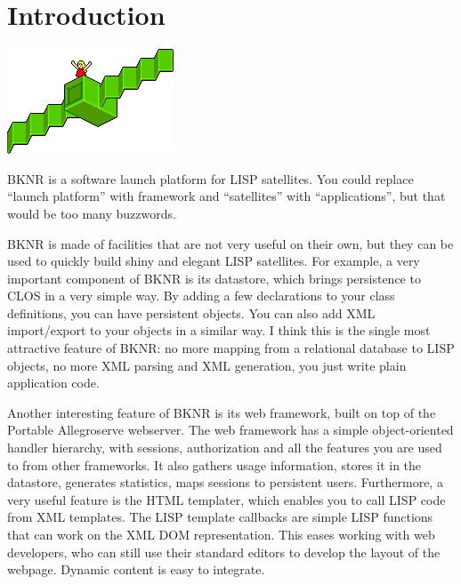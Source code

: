 \chapter{Introduction}
\label{sec:introduction}

\vbox{
\centering
\includegraphics{satelliteicon}
\vspace{1cm}
}

BKNR is a software launch platform for LISP satellites. You could
replace ``launch platform'' with framework and ``satellites'' with
``applications'', but that would be too many buzzwords.

BKNR is made of facilities that are not very useful on their own, but
they can be used to quickly build shiny and elegant LISP
satellites. For example, a very important component of BKNR is its
datastore, which brings persistence to CLOS in a very simple way. By
adding a few declarations to your class definitions, you can have
persistent objects. You can also add XML import/export to your objects
in a similar way. I think this is the single most attractive feature
of BKNR: no more mapping from a relational database to LISP objects,
no more XML parsing and XML generation, you just write plain
application code.


Another interesting feature of BKNR is its web framework, built on top
of the Portable Allegroserve webserver. The web framework has a simple
object-oriented handler hierarchy, with sessions, authorization and
all the features you are used to from other frameworks. It also
gathers usage information, stores it in the datastore, generates
statistics, maps sessions to persistent users. Furthermore, a very
useful feature is the HTML templater, which enables you to call LISP
code from XML templates. The LISP template callbacks are simple LISP
functions that can work on the XML DOM representation. This eases
working with web developers, who can still use their standard editors
to develop the layout of the webpage. Dynamic content is easy to
integrate.

